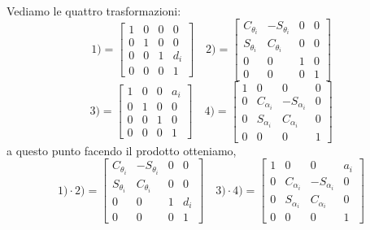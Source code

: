 \paragraph{}
Vediamo le quattro trasformazioni:
\begin{equation*}
	1) =
	\begin{bmatrix}
		1 & 0 & 0 & 0 \\
		0 & 1 & 0 & 0 \\
		0 & 0 & 1 & d_i \\
		0 & 0 & 0 & 1
	\end{bmatrix}
	\quad 2) =
	\begin{bmatrix}
		C_{\theta_i} & -S_{\theta_i} & 0 & 0 \\
		S_{\theta_i} & C_{\theta_i} & 0 & 0 \\
		0 & 0 & 1 & 0 \\
		0 & 0 & 0 & 1
	\end{bmatrix}
\end{equation*}
\begin{equation*}
	3) =
	\begin{bmatrix}
		1 & 0 & 0 & a_i \\
		0 & 1 & 0 & 0 \\
		0 & 0 & 1 & 0 \\
		0 & 0 & 0 & 1
	\end{bmatrix}
	\quad 4) =
	\begin{bmatrix}
		1 & 0 & 0 & 0 \\
		0 & C_{\alpha_i} & -S_{\alpha_i} & 0 \\
		0 & S_{\alpha_i} & C_{\alpha_i} & 0 \\
		0 & 0 & 0 & 1
	\end{bmatrix}
\end{equation*}
a questo punto facendo il prodotto otteniamo,
\begin{equation*}
	1)\cdot2) =
	\begin{bmatrix}
		C_{\theta_i} & -S_{\theta_i} & 0 & 0 \\
		S_{\theta_i} & C_{\theta_i} & 0 & 0 \\
		0 & 0 & 1 & d_i \\
		0 & 0 & 0 & 1
	\end{bmatrix}
	\quad 3)\cdot4) =
	\begin{bmatrix}
		1 & 0 & 0 & a_i \\
		0 & C_{\alpha_i} & -S_{\alpha_i} & 0 \\
		0 & S_{\alpha_i} & C_{\alpha_i} & 0 \\
		0 & 0 & 0 & 1
	\end{bmatrix}
\end{equation*}
